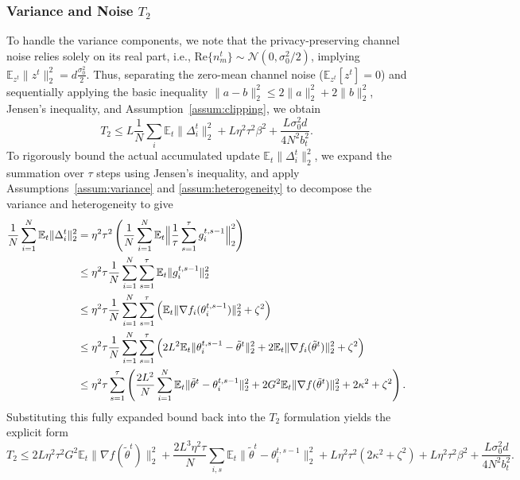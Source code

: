 \documentclass[conference]{IEEEtran}
\begin{document}
\subsubsection{Variance and Noise $T_2$}
To handle the variance components, we note that the privacy-preserving channel noise relies solely on its real part, i.e., $\mathrm{Re}\{n_m^t\} \sim \mathcal{N}(0, \sigma_0^2/2)$, implying $\mathbb{E}_{z^t}\|z^t\|_2^2 = d\frac{\sigma_0^2}{2}$. Thus, separating the zero-mean channel noise ($\mathbb{E}_{z^t}[z^t] = 0$) and sequentially applying the basic inequality $\|a-b\|_2^2 \le 2\|a\|_2^2+2\|b\|_2^2$, Jensen's inequality, and Assumption~\ref{assum:clipping}, we obtain
\begin{equation}
    T_2 \le L\frac{1}{N}\sum_{i}\mathbb{E}_t\|\Delta_i^t\|_2^2 + L\eta^2\tau^2\beta^2 + \frac{L\sigma_0^2 d}{4 N^2 b_t^2}.
\end{equation}
To rigorously bound the actual accumulated update $\mathbb{E}_t\|\Delta_i^t\|_2^2$, we expand the summation over $\tau$ steps using Jensen's inequality, and apply Assumptions~\ref{assum:variance} and \ref{assum:heterogeneity} to decompose the variance and heterogeneity to give
\begin{align}
    \frac{1}{N}\sum_{i=1}^N \mathbb{E}_t\|\Delta_i^t\|_2^2 &= \eta^2\tau^2 \left( \frac{1}{N}\sum_{i=1}^N \mathbb{E}_t\Big\|\frac{1}{\tau}\sum_{s=1}^{\tau} g_i^{t,s-1}\Big\|_2^2 \right) \notag \\
    &\le \eta^2\tau \frac{1}{N}\sum_{i=1}^N \sum_{s=1}^{\tau} \mathbb{E}_t\|g_i^{t,s-1}\|_2^2 \notag \\
    &\le \eta^2\tau \frac{1}{N}\sum_{i=1}^N \sum_{s=1}^{\tau} \left( \mathbb{E}_t\|\nabla f_i(\theta_i^{t,s-1})\|_2^2 + \zeta^2 \right) \notag \\
    &\le \eta^2\tau \frac{1}{N}\sum_{i=1}^N \sum_{s=1}^{\tau} \left( 2L^2\mathbb{E}_t\|\theta_i^{t,s-1} - \tilde{\theta}^t\|_2^2 + 2\mathbb{E}_t\|\nabla f_i(\tilde{\theta}^t)\|_2^2 + \zeta^2 \right) \notag \\
    &\le \eta^2\tau \sum_{s=1}^{\tau} \left( \frac{2L^2}{N}\sum_{i=1}^N\mathbb{E}_t\|\tilde{\theta}^t - \theta_i^{t,s-1}\|_2^2 + 2G^2\mathbb{E}_t\|\nabla f(\tilde{\theta}^t)\|_2^2 + 2\kappa^2 + \zeta^2 \right).
\end{align}
Substituting this fully expanded bound back into the $T_2$ formulation yields the explicit form
\begin{equation} \label{eqn:t2_bound}
    T_2 \le 2L\eta^2\tau^2 G^2 \mathbb{E}_t\|\nabla f(\tilde{\theta}^t)\|_2^2 + \frac{2L^3\eta^2\tau}{N}\sum_{i,s}\mathbb{E}_t\|\tilde{\theta}^t - \theta_i^{t,s-1}\|_2^2 + L\eta^2\tau^2(2\kappa^2+\zeta^2) + L\eta^2\tau^2\beta^2 + \frac{L\sigma_0^2 d}{4 N^2 b_t^2}.
\end{equation}
\end{document}
